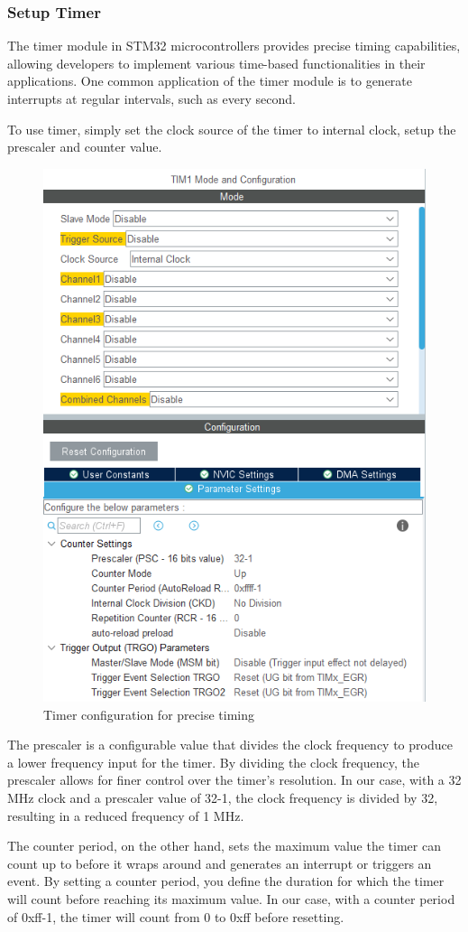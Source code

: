 \documentclass[a4paper, twoside]{report}
\begin{document}
\subsubsection{Setup Timer}
The timer module in STM32 microcontrollers provides precise timing capabilities, allowing developers to implement various time-based functionalities in their applications. One common application of the timer module is to generate interrupts at regular intervals, such as every second. 

To use timer, simply set the clock source of the timer to internal clock, setup the prescaler and counter value.

\newpage
\begin{figure}[H]
    \centering
    \includegraphics[width=.6\textwidth]{images/Timer_Config.png}
    \caption{Timer configuration for precise timing}
\end{figure}

The prescaler is a configurable value that divides the clock frequency to produce a lower frequency input for the timer. By dividing the clock frequency, the prescaler allows for finer control over the timer's resolution. In our case, with a 32 MHz clock and a prescaler value of 32-1, the clock frequency is divided by 32, resulting in a reduced frequency of 1 MHz.

The counter period, on the other hand, sets the maximum value the timer can count up to before it wraps around and generates an interrupt or triggers an event. By setting a counter period, you define the duration for which the timer will count before reaching its maximum value. In our case, with a counter period of 0xff-1, the timer will count from 0 to 0xff before resetting.
\end{document}
